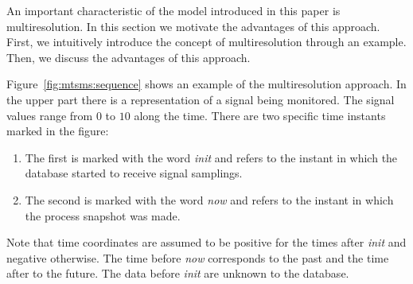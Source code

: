 


An important characteristic of the model introduced in this paper is
multiresolution. In this section we motivate the advantages of this
approach. First, we intuitively introduce the concept of
multiresolution through an example. Then, we discuss the advantages of
this approach.

Figure~\ref{fig:mtsms:sequence} shows an example of the
multiresolution approach. 
%
In the upper part there is a representation of a signal being
monitored. The signal values range from $0$ to $10$ along the
time. There are two specific time instants marked in the figure:
\begin{enumerate}
\item The first is marked with the word \emph{init} and refers to the
  instant in which the database started to receive signal samplings.
\item The second is marked with the word \emph{now} and refers to the
  instant in which the process snapshot was made.
\end{enumerate}
Note that time coordinates are assumed to be positive for the times
after \emph{init} and negative otherwise. The time before \emph{now}
corresponds to the past and the time after to the future.
The data before \emph{init} are unknown to the database.

